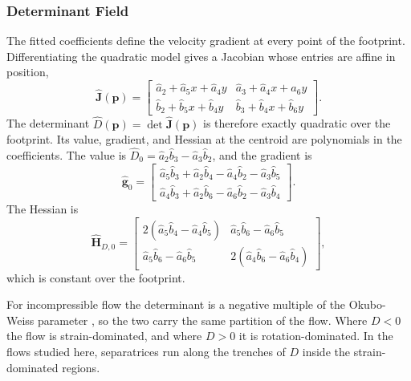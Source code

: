 \documentclass[lettersize,journal]{IEEEtran}
\begin{document}
\subsubsection{Determinant Field}
The fitted coefficients define the velocity gradient at every point of
the footprint. Differentiating the quadratic model gives a Jacobian whose
entries are affine in position,
\begin{equation}
    \hat{\mathbf{J}}(\mathbf{p}) =
    \begin{bmatrix}
        \hat{a}_2 + \hat{a}_5 x + \hat{a}_4 y &
        \hat{a}_3 + \hat{a}_4 x + \hat{a}_6 y \\
        \hat{b}_2 + \hat{b}_5 x + \hat{b}_4 y &
        \hat{b}_3 + \hat{b}_4 x + \hat{b}_6 y
    \end{bmatrix}.
    \label{eq:Jhat}
\end{equation}
The determinant $\hat{D}(\mathbf{p}) = \det\hat{\mathbf{J}}(\mathbf{p})$
is therefore exactly quadratic over the footprint. Its value, gradient,
and Hessian at the centroid are polynomials in the coefficients. The
value is $\hat{D}_0 = \hat{a}_2\hat{b}_3 - \hat{a}_3\hat{b}_2$, and the
gradient is
\begin{equation}
    \hat{\mathbf{g}}_0 =
    \begin{bmatrix}
        \hat{a}_5\hat{b}_3 + \hat{a}_2\hat{b}_4 - \hat{a}_4\hat{b}_2 - \hat{a}_3\hat{b}_5 \\
        \hat{a}_4\hat{b}_3 + \hat{a}_2\hat{b}_6 - \hat{a}_6\hat{b}_2 - \hat{a}_3\hat{b}_4
    \end{bmatrix}.
    \label{eq:grad_det}
\end{equation}
The Hessian is
\begin{equation}
    \hat{\mathbf{H}}_{D,0} =
    \begin{bmatrix}
        2(\hat{a}_5\hat{b}_4 - \hat{a}_4\hat{b}_5) &
        \hat{a}_5\hat{b}_6 - \hat{a}_6\hat{b}_5 \\
        \hat{a}_5\hat{b}_6 - \hat{a}_6\hat{b}_5 &
        2(\hat{a}_4\hat{b}_6 - \hat{a}_6\hat{b}_4)
    \end{bmatrix},
    \label{eq:hess_det}
\end{equation}
which is constant over the footprint.

For incompressible flow the determinant is a negative multiple of the
Okubo-Weiss parameter \cite{8,22}, so the two carry the same partition of
the flow. Where $D < 0$ the flow is strain-dominated, and where $D > 0$
it is rotation-dominated. In the flows studied here, separatrices run along the trenches of $D$
inside the strain-dominated regions.
\end{document}
